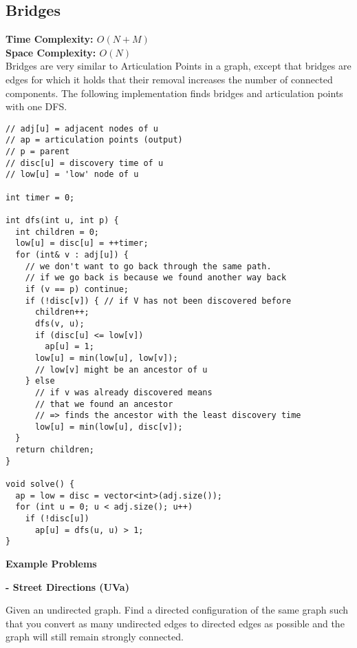 \newpage

\subsection{Bridges}

\textbf{Time Complexity: $O(N + M)$}\\
\textbf{Space Complexity: $O(N)$}\\

Bridges are very similar to Articulation Points in a graph, except
that bridges are edges for which it holds that their removal increases the number
of connected components. The following implementation \cite{CutPointsCF}
finds bridges and articulation points with one DFS.
\\

\begin{lstlisting}
// adj[u] = adjacent nodes of u
// ap = articulation points (output)
// p = parent
// disc[u] = discovery time of u
// low[u] = 'low' node of u

int timer = 0;

int dfs(int u, int p) {
  int children = 0;
  low[u] = disc[u] = ++timer;
  for (int& v : adj[u]) {
    // we don't want to go back through the same path.
    // if we go back is because we found another way back
    if (v == p) continue;
    if (!disc[v]) { // if V has not been discovered before
      children++;
      dfs(v, u);
      if (disc[u] <= low[v])
        ap[u] = 1;
      low[u] = min(low[u], low[v]);
      // low[v] might be an ancestor of u
    } else
      // if v was already discovered means
      // that we found an ancestor
      // => finds the ancestor with the least discovery time
      low[u] = min(low[u], disc[v]);
  }
  return children;
}

void solve() {
  ap = low = disc = vector<int>(adj.size());
  for (int u = 0; u < adj.size(); u++)
    if (!disc[u])
      ap[u] = dfs(u, u) > 1;
}
\end{lstlisting}

\textbf{Example Problems}

\begin{problem}
  \textbf{- Street Directions (UVa)} \cite{BridgesStreetDirections}

  Given an undirected graph. Find a directed configuration of
  the same graph such that you convert as many
  undirected edges to directed edges as possible and
  the graph will still remain strongly connected.
\end{problem}

